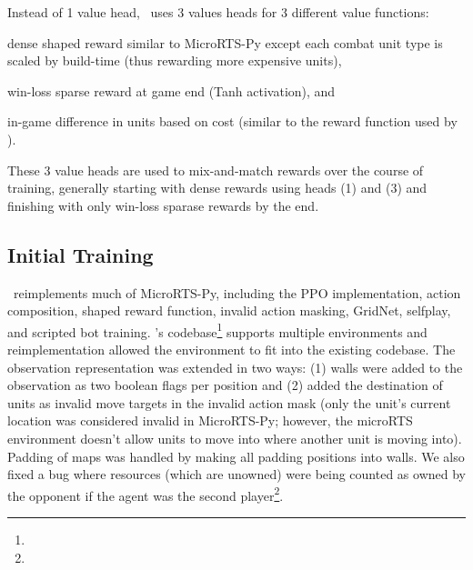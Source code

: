 \documentclass{article}
\begin{document}
Instead of 1 value head, \agentName\ uses 3 values heads for 3 different value
functions:
\begin{inparaenum}[(1)]
    \item dense shaped reward similar to MicroRTS-Py except each combat unit type is
    scaled by build-time (thus rewarding more expensive units),
    \item win-loss sparse reward at game end (Tanh activation), and
    \item in-game difference in units based on cost (similar to the reward function used
    by \citet{Winter2021}).
\end{inparaenum}
These 3 value heads are used to mix-and-match rewards over the course of training,
generally starting with dense rewards using heads (1) and (3) and finishing with only
win-loss sparase rewards by the end.

\subsection{Initial Training}
\agentName\ reimplements much of MicroRTS-Py, including the PPO implementation, action
composition, shaped reward function, invalid action masking, GridNet, selfplay, and
scripted bot training. \agentName's codebase\footnote{\rlAlgoImplsGitHubUrl} supports 
multiple environments and reimplementation allowed the environment to fit into the 
existing codebase. The observation representation was extended in two ways: (1) walls 
were added to the observation as two boolean flags per position and (2) added the 
destination of units as invalid move targets in the invalid action mask (only the unit's current location was considered
invalid in MicroRTS-Py; however, the microRTS environment doesn't allow units to move into
where another unit is moving into). Padding of maps was handled by making all padding
positions into walls. We also fixed a bug where resources (which are unowned) were being counted as owned by
the opponent if the agent was the second player\footnote{\unownedFixGitHubCommit}.
\end{document}
